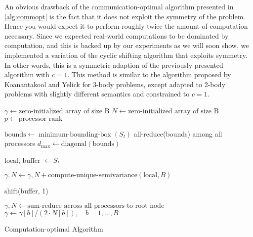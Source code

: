 
An obvious drawback of the communication-optimal algorithm presented in \ref{alg:commopt} is the fact that it does not exploit the symmetry of the problem. Hence you would expect it to perform roughly twice the amount of computation necessary. Since we expected real-world computations to be dominated by computation, and this is backed up by our experiments as we will soon show, we implemented a variation of the cyclic shifting algorithm that exploits symmetry. In other words, this is a symmetric adaption of the previously presented algorithm with $c = 1$. This method is similar to the algorithm proposed by Koanantakool and Yelick \cite{Koanantakool} for 3-body problems, except adapted to 2-body problems with slightly different semantics and constrained to $c = 1$.

\begin{algorithm}[H]
 \DontPrintSemicolon

 
 $\gamma \gets \text{zero-initialized array of size B}$ \;
 $N \gets \text{zero-initialized array of size B}$ \;
 $p \gets \text{processor rank}$
  
 $\text{bounds} \gets \operatorname{minimum-bounding-box}(S_t)$ \;
 all-reduce(bounds) among all processors \;
 $d_{\max} \gets \text{diagonal}(\text{bounds})$ \;
 
 $\text{local}$, $\text{buffer}$ $\gets S_t$ \;
 
 $\gamma, N \gets \gamma, N + \text{compute-unique-semivariance}(\text{local}, B)$ \;
 
  {
    shift(buffer, 1) \;
     
 }
 
 $\gamma, N \gets \text{sum-reduce across all processors to root node}$ \;
 $\gamma \gets \gamma[b] / (2 \cdot N[b]), \quad b = 1, ..., B$\;
 \caption{Computation-optimal Algorithm}
 \label{alg:compopt}
\end{algorithm}

